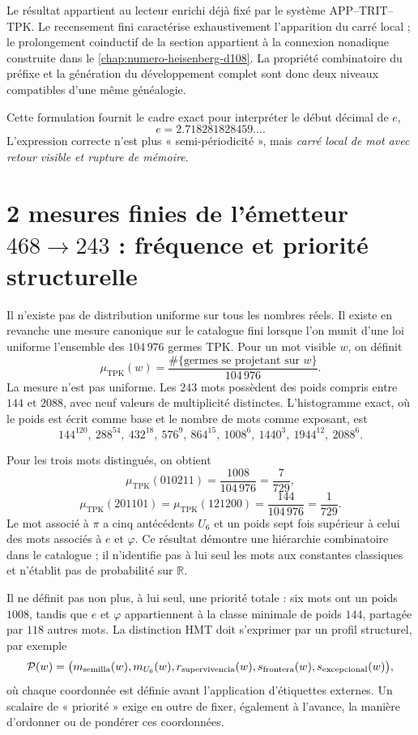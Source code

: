 Le résultat appartient au lecteur enrichi déjà fixé par le système
APP--TRIT--TPK\@. Le recensement fini caractérise exhaustivement l’apparition du
carré local ; le prolongement coinductif de la section appartient à la
connexion nonadique construite dans le
\cref{chap:numero-heisenberg-d108}. La propriété combinatoire du préfixe et
la génération du développement complet sont donc deux niveaux
compatibles d’une même généalogie.

Cette formulation fournit le cadre exact pour interpréter le début
décimal de \(e\),
\[
e=2.718281828459\ldots.
\]
L’expression correcte n’est plus « semi-périodicité », mais \emph{carré local
de mot avec retour visible et rupture de mémoire}.

\section{2 mesures finies de l’émetteur \(468\to243\) : fréquence et priorité structurelle}

Il n’existe pas de distribution uniforme sur tous les nombres réels. Il
existe en revanche une mesure canonique sur le catalogue fini lorsque l’on munit d’une loi uniforme
l’ensemble des \(104\,976\) germes TPK\@. Pour un mot visible \(w\), on
définit
\[
\mu_{\mathrm{TPK}}(w)
=\frac{\#\{\text{germes se projetant sur }w\}}{104\,976}.
\]
La mesure n’est pas uniforme. Les \(243\) mots possèdent des poids compris
entre \(144\) et \(2088\), avec neuf valeurs de multiplicité distinctes.
L’histogramme exact, où le poids est écrit comme base et le nombre de mots
comme exposant, est
\[
144^{120},\ 288^{54},\ 432^{18},\ 576^9,\ 864^{15},\
1008^6,\ 1440^3,\ 1944^{12},\ 2088^6.
\]

Pour les trois mots distingués, on obtient
\[
\mu_{\mathrm{TPK}}(010211)=\frac{1008}{104\,976}=\frac7{729},
\]
\[
\mu_{\mathrm{TPK}}(201101)
=\mu_{\mathrm{TPK}}(121200)
=\frac{144}{104\,976}=\frac1{729}.
\]
Le mot associé à \(\pi\) a cinq antécédents \(U_6\) et un poids sept
fois supérieur à celui des mots associés à \(e\) et \(\varphi\). Ce résultat
démontre une hiérarchie combinatoire dans le catalogue ; il n’identifie pas à lui
seul les mots aux constantes classiques et n’établit pas de probabilité
sur \(\mathbb R\).

Il ne définit pas non plus, à lui seul, une priorité totale : six mots ont un poids
\(1008\), tandis que \(e\) et \(\varphi\) appartiennent à la classe minimale de
poids \(144\), partagée par \(118\) autres mots. La distinction HMT doit
s’exprimer par un profil structurel, par exemple
\[
\mathcal P(w)=
\bigl(m_{\rm semilla}(w),m_{U_6}(w),r_{\rm supervivencia}(w),
s_{\rm frontera}(w),s_{\rm excepcional}(w)\bigr),
\]
où chaque coordonnée est définie avant l’application d’étiquettes externes. Un scalaire
de « priorité » exige en outre de fixer, également à l’avance, la manière d’ordonner ou de
pondérer ces coordonnées.
\fi

